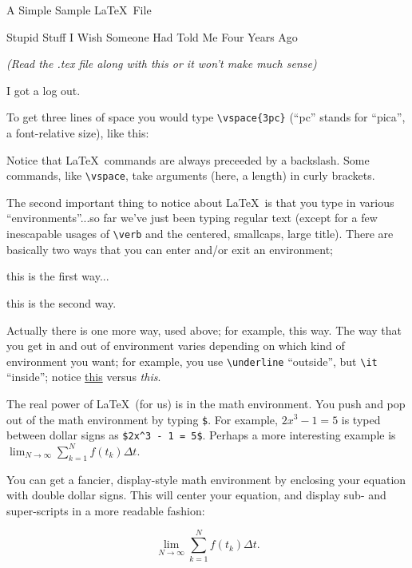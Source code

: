 \documentclass{article}
\begin{document}
\centerline{\sc \large A Simple Sample \LaTeX\ File}
\vspace{.5pc}
\centerline{\sc Stupid Stuff I Wish Someone Had Told Me Four Years Ago}
\centerline{\it (Read the .tex file along with this or it won't 
            make much sense)}
\vspace{2pc}

\huge I got a log out.

\vspace{1in}

To get three lines of space you would type \verb|\vspace{3pc}|
(``pc'' stands for ``pica'', a font-relative size), like this:
\vspace{3pc}

Notice that \LaTeX\ commands are always preceeded by a backslash.  
Some commands, like \verb|\vspace|, take arguments (here, a length) in
curly brackets.  

The second important thing to notice about \LaTeX\ is that you type 
in various ``environments''...so far we've just been typing regular 
text (except for a few inescapable usages of \verb|\verb| and the
centered, smallcaps, large title).  There are basically two ways that 
you can enter and/or exit an environment;
\vspace{1pc}

\centerline{this is the first way...}

\begin{center}
this is the second way.
\end{center}

\noindent Actually there is one more way, used above; for example, 
{\sc this way}.  The way that you get in and out of environment varies
depending on which kind of environment you want; for example, you use 
\verb|\underline| ``outside'', but \verb|\it| ``inside''; 
notice \underline{this} versus {\it this}.

The real power of \LaTeX\ (for us) is in the math environment. You 
push and pop out of the math environment by typing \verb|$|. For 
example, $2x^3 - 1 = 5$ is typed between dollar signs as
\verb|$2x^3 - 1 = 5$|. Perhaps a more interesting example is
$\lim_{N \to \infty} \sum_{k=1}^N f(t_k) \Delta t$.

You can get a fancier, display-style math 
environment by enclosing your equation with double dollar signs.  
This will center your equation, and display sub- and super-scripts in 
a more readable fashion:

$$\lim_{N \to \infty} \sum_{k=1}^N f(t_k) \Delta t.$$
\end{document}
